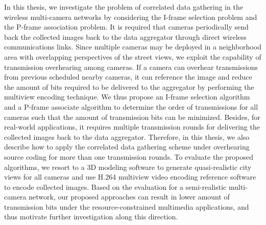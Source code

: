 In this thesis, we investigate the problem of correlated data gathering in the wireless multi-camera networks by considering the I-frame selection problem and the P-frame association problem.
It is required that cameras periodically send back the collected images back to the data aggregator through direct wireless communications links.
Since multiple cameras may be deployed in a neighborhood area with overlapping perspectives of the street views, we exploit the capability of transmission overhearing among cameras.
If a camera can overhear transmissions from previous scheduled nearby cameras, it can reference the image and reduce the amount of bits required to be delivered to the aggregator by performing the multiview encoding technique.
We thus propose an I-frame selection algorithm and a P-frame associate algorithm to determine the order of transmissions for all cameras such that the amount of transmission bits can be minimized.
Besides, for real-world applications, it requires multiple transmission rounds for delivering the collected images back to the data aggregator.
Therefore, in this thesis, we also describe how to apply the correlated data gathering scheme under overhearing source coding for more than one transmission rounds.
To evaluate the proposed algorithms, we resort to a 3D modeling software to generate quasi-realistic city views for all cameras and use H.264 multiview video encoding reference software to encode collected images.
Based on the evaluation for a semi-realistic multi-camera network, our proposed approaches can result in lower amount of transmission bits under the resource-constrained multimedia applications, and thus motivate further investigation along this direction.